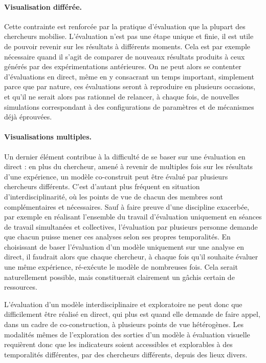 \paragraph{Visualisation différée.}

Cette contrainte est renforcée par la pratique d'évaluation que la plupart des chercheurs mobilise.
L'évaluation n'est pas une étape unique et finie, il est utile de pouvoir revenir sur les résultats à différents moments.
Cela est par exemple nécessaire quand il s'agit de comparer de nouveaux résultats produits à ceux générés par des expérimentations antérieures.
On ne peut alors se contenter d'évaluations en direct, même en y consacrant un temps important, simplement parce que par nature, ces évaluations seront à reproduire en plusieurs occasions, et qu'il ne serait alors pas rationnel de relancer, à chaque fois, de nouvelles simulations correspondant à des configurations de paramètres et de mécanismes déjà éprouvées.

\paragraph{Visualisations multiples.}

Un dernier élément contribue à la difficulté de se baser sur une évaluation en direct : en plus du chercheur, amené à revenir de multiples fois sur les résultats d'une expérience, un modèle co-construit peut être évalué par plusieurs chercheurs différents.
C'est d'autant plus fréquent en situation d'interdisciplinarité, où les points de vue de chacun des membres sont complémentaires et nécessaires.
Sauf à faire preuve d'une discipline exacerbée, par exemple en réalisant l'ensemble du travail d'évaluation uniquement en séances de travail simultanées et collectives, l'évaluation par plusieurs personne demande que chacun puisse mener ces analyses selon ses propres temporalités.
En choisissant de baser l'évaluation d'un modèle uniquement sur une analyse en direct, il faudrait alors que chaque chercheur, à chaque fois qu'il souhaite évaluer une même expérience, ré-exécute le modèle de nombreuses fois.
Cela serait naturellement possible, mais constituerait clairement un gâchis certain de ressources.

L'évaluation d'un modèle interdisciplinaire et exploratoire ne peut donc que difficilement être réalisé en direct, qui plus est quand elle demande de faire appel, dans un cadre de co-construction, à plusieurs points de vue hétérogènes.
Les modalités mêmes de l'exploration des sorties d'un modèle à évaluation visuelle requièrent donc que les indicateurs soient accessibles et explorables à des temporalités différentes, par des chercheurs différents, depuis des lieux divers.


